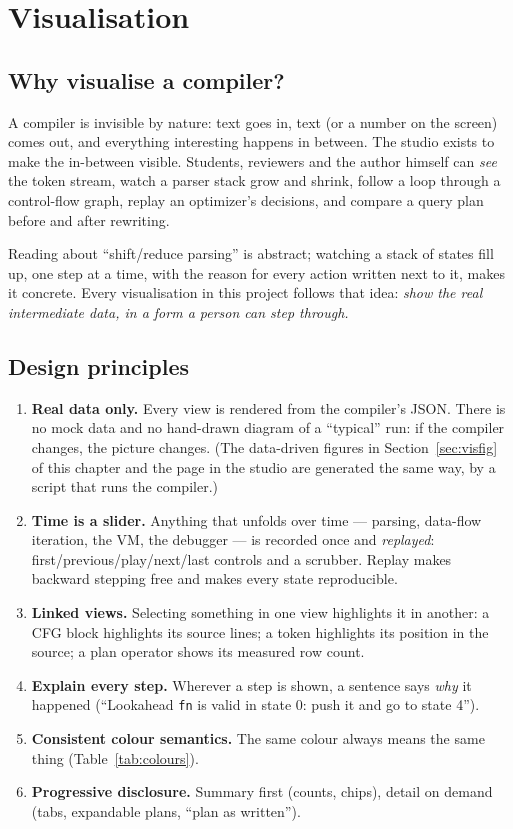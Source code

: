 
\chapter{Visualisation}
\label{ch:vis}

\section{Why visualise a compiler?}
A compiler is invisible by nature: text goes in, text (or a number on the screen) comes out, and everything interesting happens in between. The studio exists to make the in-between visible. Students, reviewers and the author himself can \emph{see} the token stream, watch a parser stack grow and shrink, follow a loop through a control-flow graph, replay an optimizer's decisions, and compare a query plan before and after rewriting.

\begin{plain}
Reading about ``shift/reduce parsing'' is abstract; watching a stack of states fill up, one step at a time, with the reason for every action written next to it, makes it concrete. Every visualisation in this project follows that idea: \emph{show the real intermediate data, in a form a person can step through.}
\end{plain}

\section{Design principles}
\begin{enumerate}
  \item \textbf{Real data only.} Every view is rendered from the compiler's JSON. There is no mock data and no hand-drawn diagram of a ``typical'' run: if the compiler changes, the picture changes. (The data-driven figures in Section~\ref{sec:visfig} of this chapter and the page in the studio are generated the same way, by a script that runs the compiler.)
  \item \textbf{Time is a slider.} Anything that unfolds over time --- parsing, data-flow iteration, the VM, the debugger --- is recorded once and \emph{replayed}: first/previous/play/next/last controls and a scrubber. Replay makes backward stepping free and makes every state reproducible.
  \item \textbf{Linked views.} Selecting something in one view highlights it in another: a CFG block highlights its source lines; a token highlights its position in the source; a plan operator shows its measured row count.
  \item \textbf{Explain every step.} Wherever a step is shown, a sentence says \emph{why} it happened (``Lookahead \texttt{fn} is valid in state 0: push it and go to state 4'').
  \item \textbf{Consistent colour semantics.} The same colour always means the same thing (Table~\ref{tab:colours}).
  \item \textbf{Progressive disclosure.} Summary first (counts, chips), detail on demand (tabs, expandable plans, ``plan as written'').
\end{enumerate}

